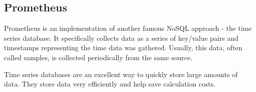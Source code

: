 \subsection{Prometheus}
\label{subsec:background:second_section:thrid_subsection}
\par Prometheus is an implementation of another famous NoSQL approach - the time series database. It specifically collects data as a series of key/value pairs and timestamps representing the time data was gathered. Usually, this data, often called samples, is collected periodically from the same source. 
\par Time series databases are an excellent way to quickly store large amounts of data. They store data very efficiently and help save calculation costs\citep{PrometheusCloud}.